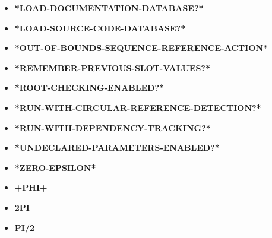 \documentclass [11pt]{book}
\begin{document}
\begin{itemize}
\item {}
\textbf{*LOAD-DOCUMENTATION-DATABASE?*}





\item {}
\textbf{*LOAD-SOURCE-CODE-DATABASE?*}





\item {}
\textbf{*OUT-OF-BOUNDS-SEQUENCE-REFERENCE-ACTION*}





\item {}
\textbf{*REMEMBER-PREVIOUS-SLOT-VALUES?*}





\item {}
\textbf{*ROOT-CHECKING-ENABLED?*}





\item {}
\textbf{*RUN-WITH-CIRCULAR-REFERENCE-DETECTION?*}





\item {}
\textbf{*RUN-WITH-DEPENDENCY-TRACKING?*}





\item {}
\textbf{*UNDECLARED-PARAMETERS-ENABLED?*}





\item {}
\textbf{*ZERO-EPSILON*}





\item {}
\textbf{+PHI+}





\item {}
\textbf{2PI}





\item {}
\textbf{PI/2}





\end{itemize}
\end{document}
